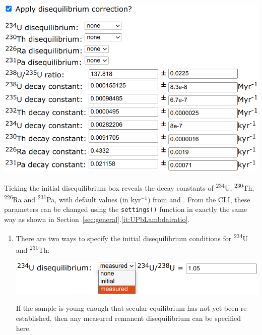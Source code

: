 \begin{refsection}
\begin{enumerate}
\noindent\begin{minipage}[t]{.6\linewidth}
  \strut\vspace*{-\baselineskip}\newline
  \includegraphics[width=\linewidth]{../figures/UPbDisequilibriumSettings.png}
  \end{minipage}
  \begin{minipage}[t]{.4\linewidth}
    Ticking the initial disequilibrium box reveals the decay constants
    of \textsuperscript{234}U, \textsuperscript{230}Th,
    \textsuperscript{226}Ra and \textsuperscript{231}Pa, with default
    values (in kyr$^{-1}$) from \citet{cheng2013} and
    \citet{audi2003}. From the CLI, these parameters can be changed
    using the \texttt{settings()} function in exactly the same way as
    shown in Section~\ref{sec:general}.\ref{it:UPbLambdairatio}.
  \end{minipage}

\begin{enumerate}

\item There are two ways to specify the initial disequilibrium
  conditions for \textsuperscript{234}U and \textsuperscript{230}Th:
  
\noindent\begin{minipage}[t]{.6\linewidth}
  \strut\vspace*{-\baselineskip}\newline
  \includegraphics[width=\linewidth]{../figures/U234-disequilibrium.png}
  \end{minipage}
  \begin{minipage}[t]{.4\linewidth}
If the sample is young enough that secular equilibrium has not yet
been re-established, then any measured remanent disequilibrium can be
specified here.
  \end{minipage}


\end{enumerate}
\end{enumerate}
\end{refsection}
